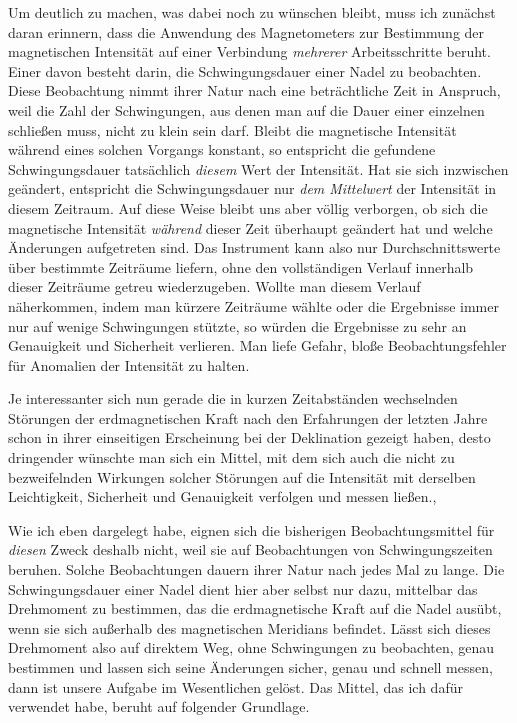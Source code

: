 Um deutlich zu machen, was dabei noch zu wünschen bleibt, muss ich zunächst daran erinnern, dass die Anwendung des Magnetometers zur Bestimmung der magnetischen Intensität auf einer Verbindung \textit{mehrerer} Arbeitsschritte beruht. Einer davon besteht darin, die Schwingungsdauer einer Nadel zu beobachten. Diese Beobachtung nimmt ihrer Natur nach eine beträchtliche Zeit in Anspruch, weil die Zahl der Schwingungen, aus denen man auf die Dauer einer einzelnen schließen muss, nicht zu klein sein darf. Bleibt die magnetische Intensität während eines solchen Vorgangs konstant, so entspricht die gefundene Schwingungsdauer tatsächlich \textit{diesem} Wert der Intensität. Hat sie sich inzwischen geändert, entspricht die Schwingungsdauer nur \textit{dem Mittelwert} der Intensität in diesem Zeitraum. Auf diese Weise bleibt uns aber völlig verborgen, ob sich die magnetische Intensität \textit{während} dieser Zeit überhaupt geändert hat und welche Änderungen aufgetreten sind. Das Instrument kann also nur Durchschnittswerte über bestimmte Zeiträume liefern, ohne den vollständigen Verlauf innerhalb dieser Zeiträume getreu wiederzugeben. Wollte man diesem Verlauf näherkommen, indem man kürzere Zeiträume wählte oder die Ergebnisse immer nur auf wenige Schwingungen stützte, so würden die Ergebnisse zu sehr an Genauigkeit und Sicherheit verlieren. Man liefe Gefahr, bloße Beobachtungsfehler für Anomalien der Intensität zu halten.

Je interessanter sich nun gerade die in kurzen Zeitabständen wechselnden Störungen der erdmagnetischen Kraft nach den Erfahrungen der letzten Jahre schon in ihrer einseitigen Erscheinung bei der Deklination gezeigt haben, desto dringender wünschte man sich ein Mittel, mit dem sich auch die nicht zu bezweifelnden Wirkungen solcher Störungen auf die Intensität mit derselben Leichtigkeit, Sicherheit und Genauigkeit verfolgen und messen ließen.,

Wie ich eben dargelegt habe, eignen sich die bisherigen Beobachtungsmittel für \textit{diesen} Zweck deshalb nicht, weil sie auf Beobachtungen von Schwingungszeiten beruhen. Solche Beobachtungen dauern ihrer Natur nach jedes Mal zu lange. Die Schwingungsdauer einer Nadel dient hier aber selbst nur dazu, mittelbar das Drehmoment zu bestimmen, das die erdmagnetische Kraft auf die Nadel ausübt, wenn sie sich außerhalb des magnetischen Meridians befindet. Lässt sich dieses Drehmoment also auf direktem Weg, ohne Schwingungen zu beobachten, genau bestimmen und lassen sich seine Änderungen sicher, genau und schnell messen, dann ist unsere Aufgabe im Wesentlichen gelöst. Das Mittel, das ich dafür verwendet habe, beruht auf folgender Grundlage.

